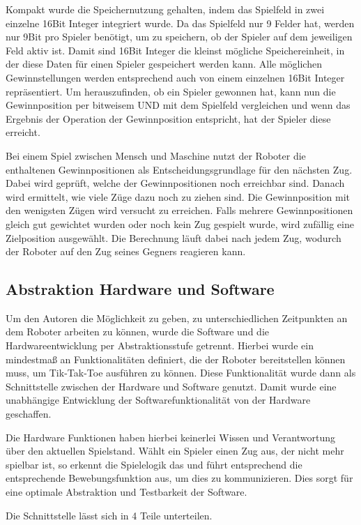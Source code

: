 \documentclass[conference,compsoc,final,a4paper]{IEEEtran}
\begin{document}
Kompakt wurde die Speichernutzung gehalten, indem das Spielfeld in zwei einzelne 16Bit Integer integriert wurde.
Da das Spielfeld nur 9 Felder hat, werden nur 9Bit pro Spieler benötigt, um zu speichern, ob der Spieler
auf dem jeweiligen Feld aktiv ist. Damit sind 16Bit Integer die kleinst mögliche Speichereinheit, in der
diese Daten für einen Spieler gespeichert werden kann. Alle möglichen Gewinnstellungen werden entsprechend
auch von einem einzelnen 16Bit Integer repräsentiert. Um herauszufinden, ob ein Spieler gewonnen hat, kann
nun die Gewinnposition per bitweisem UND mit dem Spielfeld vergleichen und wenn das Ergebnis der Operation
der Gewinnposition entspricht, hat der Spieler diese erreicht.

Bei einem Spiel zwischen Mensch und Maschine nutzt der Roboter die enthaltenen Gewinnpositionen als
Entscheidungsgrundlage für den nächsten Zug. Dabei wird geprüft, welche der Gewinnpositionen noch erreichbar
sind. Danach wird ermittelt, wie viele Züge dazu noch zu ziehen sind. Die Gewinnposition mit den
wenigsten Zügen wird versucht zu erreichen. Falls mehrere Gewinnpositionen gleich gut gewichtet wurden
oder noch kein Zug gespielt wurde, wird zufällig eine Zielposition ausgewählt. Die Berechnung läuft
dabei nach jedem Zug, wodurch der Roboter auf den Zug seines Gegners reagieren kann.

\subsection{Abstraktion Hardware und Software}

Um den Autoren die Möglichkeit zu geben, zu unterschiedlichen Zeitpunkten an dem Roboter arbeiten
zu können, wurde die Software und die Hardwareentwicklung per Abstraktionsstufe getrennt. Hierbei wurde
ein mindestmaß an Funktionalitäten definiert, die der Roboter bereitstellen können muss, um Tik-Tak-Toe
ausführen zu können. Diese Funktionalität wurde dann als Schnittstelle zwischen der Hardware und Software
genutzt. Damit wurde eine unabhängige Entwicklung der Softwarefunktionalität von der Hardware geschaffen.

Die Hardware Funktionen haben hierbei keinerlei Wissen und Verantwortung über den aktuellen Spielstand.
Wählt ein Spieler einen Zug aus, der nicht mehr spielbar ist, so erkennt die Spielelogik das und führt
entsprechend die entsprechende Bewebungsfunktion aus, um dies zu kommunizieren. Dies sorgt für eine
optimale Abstraktion und Testbarkeit der Software.

Die Schnittstelle lässt sich in 4 Teile unterteilen.
\end{document}
